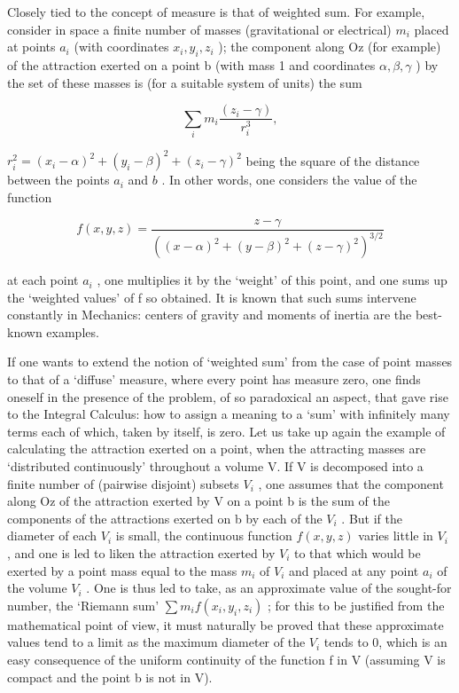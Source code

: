Closely tied to the concept of measure is that of weighted sum. For example, consider in space a finite number of masses (gravitational or electrical) \(m_{i}\) placed at points \(a_{i}\) (with coordinates \(x_{i}, y_{i}, z_{i}\) ); the component along Oz (for example) of the attraction exerted on a point b (with mass 1 and coordinates \(\alpha, \beta, \gamma\) ) by the set of these masses is (for a suitable system of units) the sum

\[
\sum_ {i} m _ {i} \frac {(z _ {i} - \gamma)}{r _ {i} ^ {3}},
\]

\(r_i^2 = (x_i - \alpha)^2 + (y_i - \beta)^2 + (z_i - \gamma)^2\) being the square of the distance between the points \(a_i\) and \(b\) . In other words, one considers the value of the function

\[
f (x, y, z) = \frac {z - \gamma}{\left((x - \alpha) ^ {2} + (y - \beta) ^ {2} + (z - \gamma) ^ {2}\right) ^ {3 / 2}}
\]

at each point \(a_{i}\) , one multiplies it by the `weight' of this point, and one sums up the `weighted values' of f so obtained. It is known that such sums intervene constantly in Mechanics: centers of gravity and moments of inertia are the best-known examples.

If one wants to extend the notion of `weighted sum' from the case of point masses to that of a `diffuse' measure, where every point has measure zero, one finds oneself in the presence of the problem, of so paradoxical an aspect, that gave rise to the Integral Calculus: how to assign a meaning to a `sum' with infinitely many terms each of which, taken by itself, is zero. Let us take up again the example of calculating the attraction exerted on a point, when the attracting masses are `distributed continuously' throughout a volume V. If V is decomposed into a finite number of (pairwise disjoint) subsets \(V_{i}\) , one assumes that the component along Oz of the attraction exerted by V on a point b is the sum of the components of the attractions exerted on b by each of the \(V_{i}\) . But if the diameter of each \(V_{i}\) is small, the continuous function \(f(x,y,z)\) varies little in \(V_{i}\) , and one is led to liken the attraction exerted by \(V_{i}\) to that which would be exerted by a point mass equal to the mass \(m_{i}\) of \(V_{i}\) and placed at any point \(a_{i}\) of the volume \(V_{i}\) . One is thus led to take, as an approximate value of the sought-for number, the `Riemann sum' \(\sum m_{i}f(x_{i},y_{i},z_{i})\) ; for this to be justified from the mathematical point of view, it must naturally be proved that these approximate values tend to a limit as the maximum diameter of the \(V_{i}\) tends to 0, which is an easy consequence of the uniform continuity of the function f in V (assuming V is compact and the point b is not in V).

